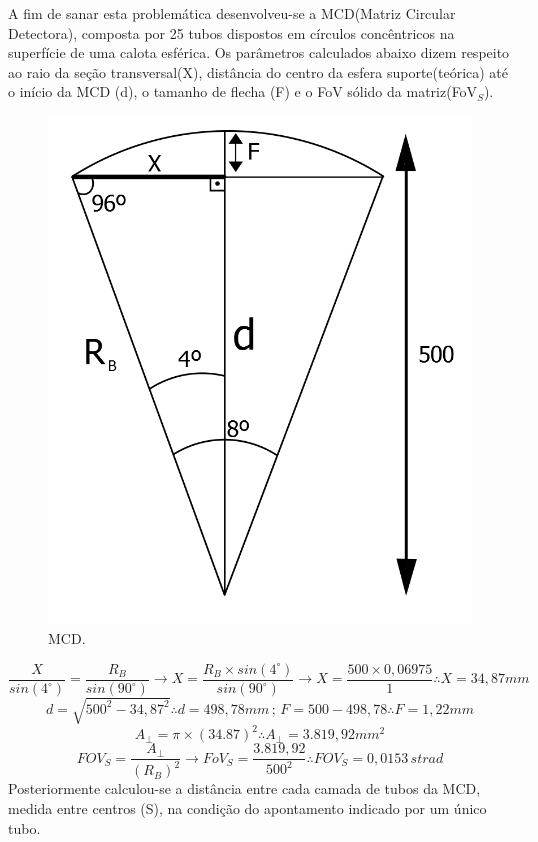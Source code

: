 \documentclass[a4paper,12pt]{article}
\begin{document}
A fim de sanar esta problemática desenvolveu-se a MCD(Matriz Circular Detectora), composta por 25 tubos  dispostos em círculos concêntricos na superfície de uma calota esférica. Os parâmetros calculados abaixo dizem respeito ao raio da seção transversal(X), distância do centro da esfera suporte(teórica) até o início da MCD (d), o tamanho de flecha (F) e o FoV sólido da matriz(FoV$_{S}$).
\begin{figure}[htb] 
	\centering
	\includegraphics[scale=0.3]{MCD_2.jpg}
	\caption{MCD.}
\end{figure}
$$ \frac{X}{sin(4^{\circ})} = \frac{R_{B}}{sin(90^{\circ})}\longrightarrow X= \frac{R_{B}\times sin(4^{\circ})}{sin(90^{\circ})} \longrightarrow X=\frac{500\times 0,06975}{1} \therefore X=34,87mm $$
$$d = \sqrt{500^{2} - 34,87^{2}} \therefore d=498,78mm \, ;\, F=500-498,78 \therefore F=1,22mm $$
$$ A_{\bot } = \pi\times(34.87)^{2} \therefore A_{\bot } = 3.819,92mm^{2} $$ 
$$ FOV_{S} = \frac{A_{\bot }}{(R_{B})^{2}} \longrightarrow FoV_{S} =\frac{3.819,92}{500^{2}} \therefore FOV_{S} = 0,0153 \, strad$$ 
\newpage
Posteriormente calculou-se a distância entre cada camada de tubos da MCD, medida entre centros (S), na condição do apontamento indicado por um único tubo. 
\end{document}
